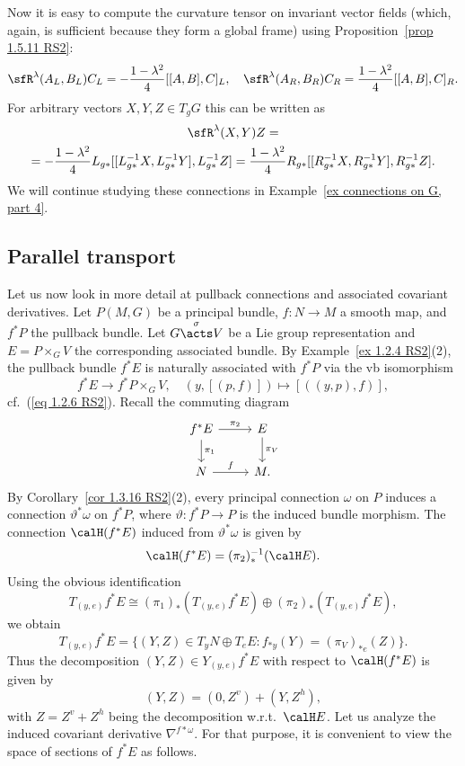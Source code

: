 \begin{example}
    Now it is easy to compute the curvature tensor on invariant vector fields (which, again, is sufficient because they form a global frame) using Proposition~\ref{prop 1.5.11 RS2}:
    \[\sfR^\lambda(A_L,B_L)C_L=-\frac{1-\lambda^2}{4}[[A,B],C]_L,\quad \sfR^\lambda(A_R,B_R)C_R=\frac{1-\lambda^2}{4}[[A,B],C]_R.\]
    For arbitrary vectors $X,Y,Z\in T_g G$ this can be written as
    \begin{multline}
        \sfR^\lambda(X,Y)Z=\\=-\frac{1-\lambda^2}{4}L_{g\ast}[[L_{g\ast}^{-1}X,L_{g\ast}^{-1}Y],L_{g\ast}^{-1}Z]=\frac{1-\lambda^2}{4}R_{g\ast}[[R_{g\ast}^{-1}X,R_{g\ast}^{-1}Y],R_{g\ast}^{-1}Z].
    \end{multline}
    We will continue studying these connections in Example~\ref{ex connections on G, part 4}.
\end{example}









\subsection{Parallel transport}


Let us now look in more detail at pullback connections and associated covariant derivatives. Let $P(M,G)$ be a principal bundle, $f:N\to M$ a smooth map, and $f^\ast P$ the pullback bundle. Let $G\overset{\sigma}{\acts}V$ be a Lie group representation and $E=P\times_G V$ the corresponding associated bundle. By Example~\ref{ex 1.2.4 RS2}(2), the pullback bundle $f^\ast E$ is naturally associated with $f^\ast P$ via the \gls{vb} isomorphism
\[f^\ast E\to f^\ast P\times_G V,\quad (y,[(p,f)])\mapsto [((y,p),f)],\]
cf.\ (\ref{eq 1.2.6 RS2}). 
Recall the commuting diagram
\[\begin{tikzcd}
    f^\ast E\arrow[r,"\pi_2"]\arrow[d,"\pi_1"]& E\arrow[d,"\pi_V"]\\
    N\arrow[r,"f"]&M.
\end{tikzcd}\]
By Corollary~\ref{cor 1.3.16 RS2}(2), every principal connection $\omega$ on $P$ induces a connection $\vartheta^\ast\omega$ on $f^\ast P$, where $\vartheta: f^\ast P\to P$ is the induced bundle morphism. The connection $\calH (f^\ast E)$ induced from $\vartheta^\ast\omega$ is given by
\[\calH (f^\ast E)=(\pi_2)_\ast^{-1}(\calH E).\]
Using the obvious identification
\[T_{(y,e)}f^\ast E\cong (\pi_1)_\ast (T_{(y,e)}f^\ast E)\oplus (\pi_2)_\ast(T_{(y,e)}f^\ast E),\]
we obtain
\[T_{(y,e)}f^\ast E=\{(Y,Z)\in T_y N\oplus T_e E:f_{\ast y}(Y)=(\pi_V)_{\ast e}(Z)\}.\]
Thus the decomposition $(Y,Z)\in Y_{(y,e)}f^\ast E$ with respect to $\calH (f^\ast E)$ is given by
\[(Y,Z)=(0,Z^v)+(Y,Z^h),\label{eq 1.5.15 RS2}\]
with $Z=Z^v+Z^h$ being the decomposition w.r.t.\ $\calH E$. Let us analyze the induced covariant derivative $\nabla^{f\ast \omega}$. For that purpose, it is convenient to view the space of sections of $f^\ast E$ as follows.

